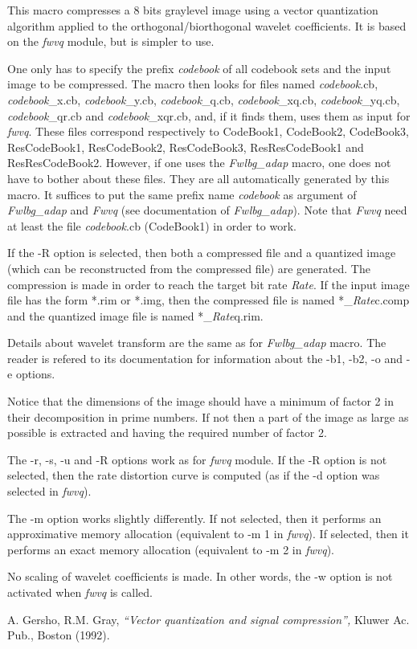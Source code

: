 This macro compresses a 8 bits graylevel image using a vector quantization 
algorithm applied to the orthogonal/biorthogonal wavelet coefficients. 
It is based on the {\em fwvq} module, but is simpler to use. 

One only has to specify the prefix {\em codebook} of all codebook sets 
and the input image to be compressed. The macro then looks for files 
named {\em codebook}.cb, {\em codebook}\_x.cb, {\em codebook}\_y.cb, 
{\em codebook}\_q.cb, {\em codebook}\_xq.cb, {\em codebook}\_yq.cb, 
{\em codebook}\_qr.cb and {\em codebook}\_xqr.cb, and, if it finds them, 
uses them as input for {\em fwvq}. These files correspond respectively to 
CodeBook1, CodeBook2, CodeBook3, ResCodeBook1, ResCodeBook2, ResCodeBook3, 
ResResCodeBook1 and ResResCodeBook2. 
However, if one uses the {\em Fwlbg\_adap} macro, one does not have to 
bother about these files. They are all automatically generated by this macro. 
It suffices to put the same prefix name {\em codebook} as argument 
of {\em Fwlbg\_adap} and {\em Fwvq} (see documentation of {\em Fwlbg\_adap}). 
Note that {\em Fwvq} need at least the file {\em codebook}.cb (CodeBook1) 
in order to work. 

If the -R option is selected, then both a compressed file and a quantized 
image (which can be reconstructed from the compressed file) are generated. 
The compression is made in order to reach the target bit rate {\em Rate}. 
If the input image file has the form *.rim or *.img, then 
the compressed file is named *\_{\em Rate}c.comp and the quantized image file 
is named *\_{\em Rate}q.rim.

Details about wavelet transform are the same as for {\em Fwlbg\_adap} macro. 
The reader is refered to its documentation for information about the -b1, -b2, 
-o and -e options. 

Notice that the dimensions of the image should have a minimum of factor 2 
in their decomposition in prime numbers. If not then a part of the 
image as large as possible is extracted and having the required 
number of factor 2. 

The -r, -s, -u and -R options work as for {\em fwvq} module. If the -R 
option is not selected, then the rate distortion curve is computed 
(as if the -d option was selected in {\em fwvq}). 

The -m option works slightly differently. If not selected, then it 
performs an approximative memory allocation (equivalent to -m 1 
in {\em fwvq}). If selected, then it performs an exact memory allocation 
(equivalent to -m 2 in {\em fwvq}).

No scaling of wavelet coefficients is made. In other words, 
the -w option is not activated when {\em fwvq} is called. 

\begin{thebibliography}{999999}

 A. Gersho, R.M. Gray, {\em ``Vector quantization 
and signal compression'', } Kluwer Ac. Pub., Boston (1992). 

\end{thebibliography}

